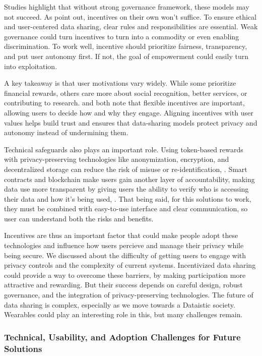 	Studies highlight that without strong governance framework, these models may not succeed. As \cite{Abraham2019} point out, incentives on their own won't suffice. To ensure ethical and user-centered data sharing, clear rules and responsibilities are essential. Weak governance could turn incentives to turn into a commodity or even enabling discrimination. To work well, incentive should prioritize fairness, transparency, and put user autonomy first.
	If not, the goal of empowerment could easily turn into exploitation.

	A key takeaway is that user motivations vary widely. While some prioritize financial rewards, others care more about social recognition, better services, or contributing to research. \cite{Park2023} and \cite{Boonsong2024} both note that flexible incentives are important, allowing users to decide how and why they engage. Aligning incentives with user values helps build trust and ensures that data-sharing models protect privacy and autonomy instead of undermining them.

	Technical safeguards also plays an important role. Using token-based rewards with privacy-preserving technologies like anonymization, encryption, and decentralized storage can reduce the risk of misuse or re-identification, \cite{Abouelmehdi2018}. Smart contracts and blockchain make users gain another layer of accountability, making data use more transparent by giving users the ability to verify who is accessing their data and how it's being used, \cite{Zyskind2015}. That being said, for this solutions to work, they must be combined with easy-to-use interface and clear communication, so user can understand both the risks and benefits.

	Incentives are thus an important factor that could make people adopt these technologies and influence how users percieve and manage their privacy while being secure. We discussed about the difficulty of getting users to engage with privacy controls and the complexity of current systems. Incentivized data sharing could provide a way to overcome these barriers, by making participation more attractive and rewarding. 
	But their success depends on careful design, robust governance, and the integration of privacy-preserving technologies. The future of data sharing is complex, especially as we move towards a Dataistic society. Wearables could play an interesting role in this, but many challenges remain.
	\subsubsection{Technical, Usability, and Adoption Challenges for Future Solutions}

